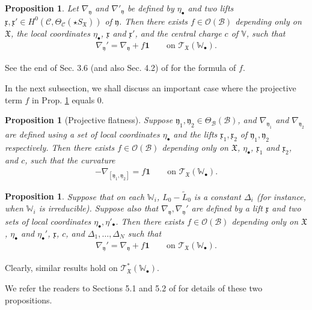 \documentclass[11pt,b5paper,notitlepage]{article}
\theoremstyle{definition}
\theoremstyle{plain}
\newtheorem{pp}[df]{Proposition}
\newcommand{\fk}{\mathfrak}
\newcommand{\mc}{\mathcal}
\newcommand{\wtd}{\widetilde}
\newcommand{\id}{\mathbf{1}}
\newcommand{\scr}{\mathscr}
\newcommand{\xk}{\mathfrak x}
\newcommand{\yk}{\mathfrak y}
\newcommand{\SX}{{S_{\fk X}}}
\newcommand{\blt}{\bullet}
\newcommand{\Vbb}{\mathbb V}
\newcommand{\Wbb}{\mathbb W}
\numberwithin{equation}{section}
\begin{document}
\begin{pp}\label{lb152}
Let $\nabla_\yk$ and $\nabla'_\yk$ be defined by $\eta_\blt$ and two lifts $\xk,\xk'\in H^0(\mc C,\Theta_{\mc C}(\star\SX))$ of $\yk$. Then there exists $f\in \scr O(\mc B)$ depending only on $\fk X$, the local coordinates $\eta_\blt$, $\xk$ and $\xk'$, and the central charge $c$ of $\Vbb$, such that
\begin{align}
\nabla_\yk'=\nabla_\yk+f\id\qquad\text{on }\scr T_{\fk X}(\Wbb_\blt).
\end{align}
\end{pp}

See the end of Sec. 3.6 (and also Sec. 4.2) of \cite{Gui} for the formula of $f$.

In the next subsection, we shall discuss an important case where the projective term $f$ in Prop. \ref{lb152} equals $0$.

\begin{pp}[Projective flatness]
Suppose $\yk_1,\yk_2\in\Theta_{\mc B}(\mc B)$, and $\nabla_{\yk_1}$ and $\nabla_{\yk_2}$ are defined using a set of local coordinates $\eta_\blt$ and the lifts $\xk_1,\xk_2$ of $\yk_1,\yk_2$ respectively. Then  there exists $f\in\scr O(\mc B)$ depending only on $\fk X$, $\eta_\blt$, $\xk_1$ and $\xk_2$, and $c$, such that the curvature
\begin{align*}
[\nabla_{\yk_1},\nabla_{\yk_2}]-\nabla_{[\yk_1,\yk_2]}=f\id\qquad \text{on }\scr T_{\fk X}(\Wbb_\blt).
\end{align*}
\end{pp}

\begin{pp}
Suppose  that on each $\Wbb_i$, $L_0-\wtd L_0$ is a constant $\Delta_i$ (for instance, when $\Wbb_i$ is irreducible). Suppose also that $\nabla_\yk,\nabla_\yk'$ are defined by a lift $\xk$ and two sets of local coordinates $\eta_\blt,\eta'_\blt$. Then  there exists $f\in\scr O(\mc B)$ depending only on $\fk X$, $\eta_\blt$ and $\eta_\blt'$, $\xk$, $c$, and $\Delta_1,\dots,\Delta_N$ such that
\begin{align}
\nabla_\yk'=\nabla_\yk+f\id\qquad\text{on }\scr T_{\fk X}(\Wbb_\blt).
\end{align}
\end{pp}
Clearly, similar results hold on $\scr T_{\fk X}^*(\Wbb_\blt)$.

We refer the readers to Sections 5.1 and 5.2 of \cite{Gui} for details of these two propositions.



\subsection{}
\end{document}
